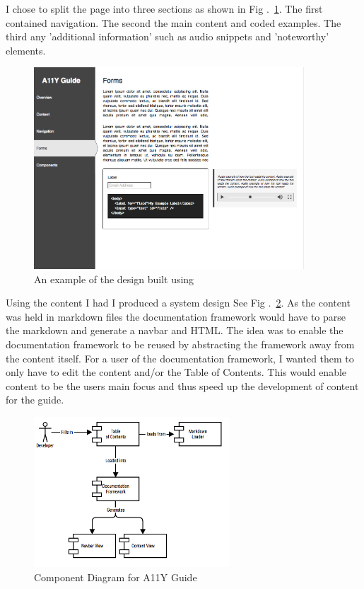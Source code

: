 I chose to split the page into three sections as shown in Fig
.~\ref{fig:a11y_guide_design}. The first contained navigation. The second the main
content and coded examples. The third any 'additional information' such as
audio snippets and 'noteworthy' elements.

\begin{figure}[H]
\centering
\includegraphics[width=0.9\textwidth]{figures/a11y_guide_design}
\captionsetup{justification=centering}
\caption{An example of the design built using \cite*{Moqups}
\label{fig:a11y_guide_design}}
\end{figure}

Using the content I had I produced a system design See Fig
.~\ref{fig:allycomponent}. As the content was held in markdown files the
documentation framework would have to parse the markdown and generate a
navbar and HTML. The idea was to enable the documentation framework to be
reused by abstracting the framework away from the content itself. For a user
of the documentation framework, I wanted them to only have to edit the
content and/or the Table of Contents. This would enable content to be the
users main focus and thus speed up the development of content for the guide.

\begin{figure}[H]
\centering
\includegraphics[width=0.65\textwidth]{figures/documentation_design}
\captionsetup{justification=centering}
\caption{Component Diagram for A11Y Guide
\label{fig:allycomponent}}
\end{figure}

